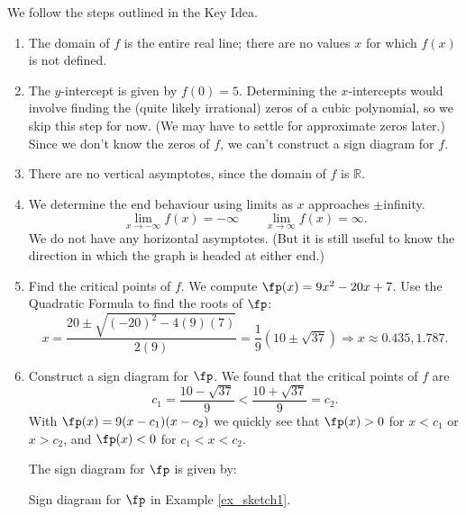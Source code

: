 {We follow the steps outlined in the Key Idea.
\begin{enumerate}
\item		The domain of $f$ is the entire real line; there are no values $x$ for which $f(x)$ is not defined.
\item		The $y$-intercept is given by $f(0)=5$. Determining the $x$-intercepts would involve finding the (quite likely irrational) zeros of a cubic polynomial, so we skip this step for now. (We may have to settle for approximate zeros later.) Since we don't know the zeros of $f$, we can't construct a sign diagram for $f$.
\item		There are no vertical asymptotes, since the domain of $f$ is $\mathbb{R}$.
\item		We determine the end behaviour using limits as $x$ approaches $\pm$infinity.				
\[
\lim_{x\to -\infty} f(x) = -\infty \qquad \lim_{x\to \infty}f(x) = \infty.
\]
			We do not have any horizontal asymptotes. (But it is still useful to know the direction in which the graph is headed at either end.)

\item		Find the critical points of $f$. We compute $\fp(x) = 9x^2-20x+7$. Use the Quadratic Formula to find the roots of $\fp$:
\[
x = \frac{20\pm \sqrt{(-20)^2-4(9)(7)}}{2(9)} = \frac19\left(10\pm\sqrt{37}\right) \Rightarrow x\approx 0.435, 1.787.
\]
\item 		Construct a sign diagram for $\fp$. We found that the critical points of $f$ are 
\[
c_1 = \frac{10-\sqrt{37}}{9} < \frac{10+\sqrt{37}}{9} = c_2.
\]
With $\fp(x) = 9(x-c_1)(x-c_2)$ we quickly see that $\fp(x)>0$ for $x<c_1$ or $x>c_2$, and $\fp(x)<0$ for $c_1<x<c_2$.

\pagebreak

The sign diagram for $\fp$ is given by:

\noindent\begin{minipage}{\textwidth}
\begin{center}
\end{center}
\captionsetup{type=figure}%
			\caption{Sign diagram for $\fp$ in Example \ref{ex_sketch1}.}\label{fig:sketchline1fp}
\end{minipage}


\end{enumerate}}
